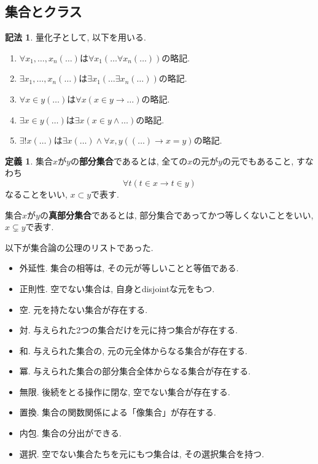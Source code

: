 \documentclass[a4paper, twoside]{bxjsarticle}
\theoremstyle{definition}
\newtheorem{defn}[thm]{定義}
\newtheorem{notation}[thm]{記法}
\begin{document}
    \subsection{集合とクラス}
        \begin{notation}
            量化子として, 以下を用いる.
            \begin{enumerate}
                \item $\forall x_1, \dots , x_n (\dots)$は$\forall x_1 (\dots \forall x_n (\dots))$の略記.
                \item $\exists x_1, \dots , x_n (\dots)$は$\exists x_1 (\dots \exists x_n (\dots))$の略記.
                \item $\forall x\in y (\dots)$は$\forall x (x\in y \to \dots)$の略記.
                \item $\exists x\in y (\dots)$は$\exists x (x\in y \land \dots)$の略記.
                \item $\exists! x (\dots)$は$\exists x (\dots) \land \forall x, y ((\dots) \to x=y)$の略記.
            \end{enumerate}
        \end{notation}
        \begin{defn}
            集合$x$が$y$の\textbf{部分集合}であるとは, 全ての$x$の元が$y$の元でもあること, すなわち\[\forall t (t\in x \to t\in y)\]なることをいい, $x\subset y$で表す.
            
            集合$x$が$y$の\textbf{真部分集合}であるとは, 部分集合であってかつ等しくないことをいい, $x\subsetneq y$で表す.
        \end{defn}
        \begin{framed}
            以下が集合論の公理のリストであった.
            \begin{itemize}
                \item 外延性. 集合の相等は, その元が等しいことと等価である.
                \item 正則性. 空でない集合は, 自身とdisjointな元をもつ.
                \item 空. 元を持たない集合が存在する.
                \item 対. 与えられた2つの集合だけを元に持つ集合が存在する.
                \item 和. 与えられた集合の, 元の元全体からなる集合が存在する.
                \item 冪. 与えられた集合の部分集合全体からなる集合が存在する.
                \item 無限. 後続をとる操作に閉な, 空でない集合が存在する.
                \item 置換. 集合の関数関係による「像集合」が存在する.
                \item 内包. 集合の分出ができる.
                \item 選択. 空でない集合たちを元にもつ集合は, その選択集合を持つ.
            \end{itemize}
        \end{framed}
\end{document}
